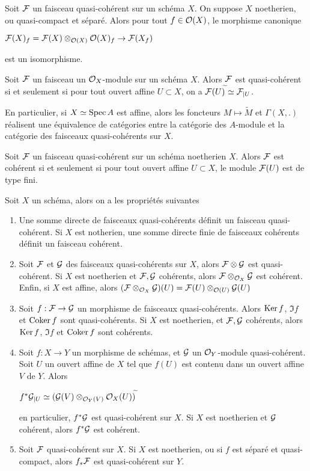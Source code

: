 \begin{prop}\label{FQCProp2}
Soit $\mathcal{F}$ un faisceau quasi-cohérent sur un schéma $X$. On suppose $X$ noetherien, ou quasi-compact et séparé. Alors pour tout $f\in \mathcal{O}(X)$, le morphisme canonique
\begin{center}
$\mathcal{F}(X)_f=\mathcal{F}(X)\otimes_{\mathcal{O}(X)}\mathcal{O}(X)_f\rightarrow \mathcal{F}(X_f)$
\end{center}
est un isomorphisme.
\end{prop}

\begin{thm}\label{FQCThm}
Soit $\mathcal{F}$ un faisceau un $\mathcal{O}_X$-module sur un schéma $X$. Alors $\mathcal{F}$ est quasi-cohérent si et seulement si pour tout ouvert affine $U\subset X$, on a $\mathcal{F}(U)^{\widetilde{}}\simeq\mathcal{F}_{|U}$.

En particulier, si $X\simeq \operatorname{Spec} A$ est affine, alors les foncteurs $M\mapsto \widetilde{M}$ et $\Gamma(X,.)$ réalisent une équivalence de catégories entre la catégorie des $A$-module et la catégorie des faisceaux quasi-cohérents sur $X$.
\end{thm}

\begin{prop}
Soit $\mathcal{F}$ un faisceau quasi-cohérent sur un schéma noetherien $X$. Alors $\mathcal{F}$ est cohérent si et seulement si pour tout ouvert affine $U\subset X$, le module $\mathcal{F}(U)$ est de type fini. 
\end{prop}

\begin{prop}\label{FQCProps3}
Soit $X$ un schéma, alors on a les propriétés suivantes
\begin{enumerate}
\item Une somme directe de faisceaux quasi-cohérents définit un faisceau quasi-cohérent. Si $X$ est notherien, une somme directe finie de faisceaux cohérents définit un faisceau cohérent.
\item Soit $\mathcal{F}$ et $\mathcal{G}$ des faisceaux quasi-cohérents sur $X$, alors $\mathcal{F}\otimes \mathcal{G}$ est quasi-cohérent. Si $X$ est noetherien et $\mathcal{F},\mathcal{G}$ cohérents, alors $\mathcal{F}\otimes_{\mathcal{O}_X} \mathcal{G}$ est cohérent. Enfin, si $X$ est affine, alors $(\mathcal{F}\otimes_{\mathcal{O}_X}\mathcal{G})(U)=\mathcal{F}(U)\otimes_{\mathcal{O}(U)}\mathcal{G}(U)$
\item Soit $f:\mathcal{F}\rightarrow \mathcal{G}$ un morphisme de faisceaux quasi-cohérents. Alors $\operatorname{Ker} f$, $\Im f$ et $\operatorname{Coker} f$ sont quasi-cohérents. Si $X$ est noetherien, et $\mathcal{F}, \mathcal{G}$ cohérents, alors $\operatorname{Ker} f$, $\Im f$ et $\operatorname{Coker} f$ sont cohérents.
\item Soit $f:X\rightarrow Y$ un morphisme de schémas, et $\mathcal{G}$ un $\mathcal{O}_Y$-module quasi-cohérent. Soit $U$ un ouvert affine de $X$ tel que $f(U)$ est contenu dans un ouvert affine $V$ de $Y$. Alors
\begin{center}
$f^*\mathcal{G}_{|U}\simeq(\mathcal{G}(V)\otimes_{\mathcal{O}_Y(V)}\mathcal{O}_X(U))^{\widetilde{}}$
\end{center}
en particulier, $f^*\mathcal{G}$ est quasi-cohérent sur $X$. Si $X$ est noetherien et $\mathcal{G}$ cohérent, alors $f^*\mathcal{G}$ est cohérent.
\item Soit $\mathcal{F}$ quasi-cohérent sur $X$. Si $X$ est noetherien, ou si $f$ est séparé et quasi-compact, alors $f_*\mathcal{F}$ est quasi-cohérent sur $Y$.
\end{enumerate}
\end{prop}

